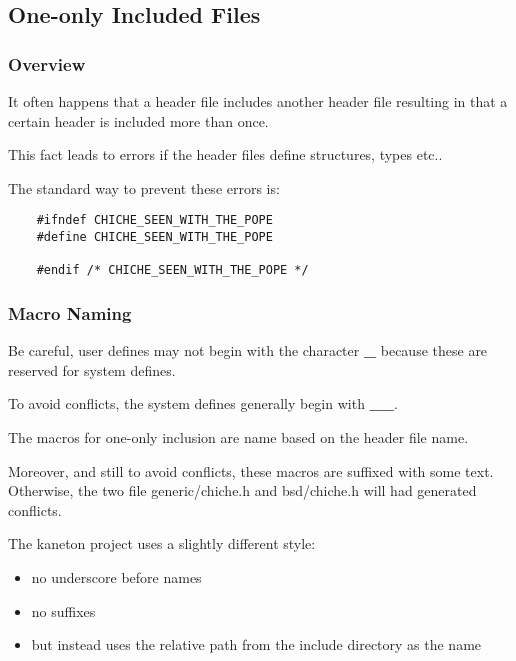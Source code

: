 \documentclass[9pt]{beamer}
\newcommand{\nl}[0]{\vspace{0.4cm}}
\begin{document}
%
%

\subsection{One-only Included Files}


\begin{frame}[containsverbatim]
  \frametitle{Overview}

  It often happens that a header file includes another header file resulting in
  that a certain header is included more than once.

  \nl

  This fact leads to errors if the header files define structures, types etc..

  \nl

  The standard way to prevent these errors is:

  \begin{verbatim}
    #ifndef CHICHE_SEEN_WITH_THE_POPE
    #define CHICHE_SEEN_WITH_THE_POPE

    #endif /* CHICHE_SEEN_WITH_THE_POPE */
  \end{verbatim}
\end{frame}


\begin{frame}
  \frametitle{Macro Naming}

  Be careful, user defines may not begin with the character \textbf{\_}
  because these are reserved for system defines.

  \nl

  To avoid conflicts, the system defines generally begin with \textbf{\_\_}.

  \nl

  The macros for one-only inclusion are name based on the header file name.

  \nl

  Moreover, and still to avoid conflicts, these macros are suffixed with
  some text. Otherwise, the two file generic/chiche.h and bsd/chiche.h
  will had generated conflicts.

  \nl

  The kaneton project uses a slightly different style:

  \begin{itemize}[<+->]
    \item
      no underscore before names
    \item
      no suffixes
    \item
      but instead uses the relative path from the include directory
      as the name
  \end{itemize}

\end{frame}
\end{document}
